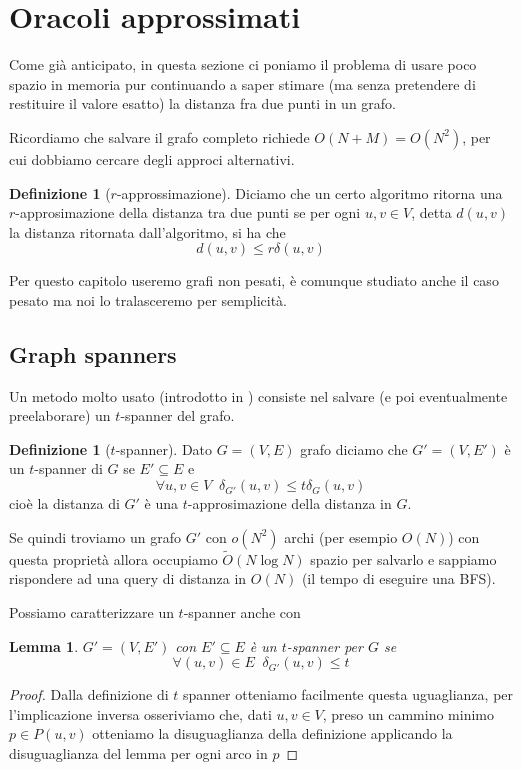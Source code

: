 \documentclass[a4paper,10pt]{amsbook}
\newcounter{counter1}
\theoremstyle{plain}
\newtheorem{mylem}[counter1]{Lemma}
\theoremstyle{definition}
\newtheorem{mydef}[counter1]{Definizione}
\theoremstyle{remark}
\newcommand{\pa}[1]{\left(#1\right)}
\begin{document}
\section{Oracoli approssimati}
\label{sec:oracoliapprossimati}

Come gi\`a anticipato, in questa sezione ci poniamo il problema di
usare poco spazio in memoria pur continuando a saper stimare (ma senza
pretendere di restituire il valore esatto) la distanza fra due punti
in un grafo.

Ricordiamo che salvare il grafo completo richiede $O\pa{ N + M } =
O\pa{ N^2}$, per cui dobbiamo cercare degli approci alternativi.

\begin{mydef}[$r$-approssimazione]
  Diciamo che un certo algoritmo ritorna una $r$-approsimazione della
  distanza tra due punti se per ogni $u,v \in V$, detta $d(u,v)$ la
  distanza ritornata dall'algoritmo, si ha che
  \[ d\pa{u,v} \le r \delta\pa{u,v} \]
\end{mydef}

Per questo capitolo useremo grafi non pesati, \`e comunque studiato
anche il caso pesato ma noi lo tralasceremo per semplicit\`a.

\subsection{Graph spanners}

Un metodo molto usato (introdotto in \cite{graphspanners}) consiste
nel salvare (e poi eventualmente preelaborare) un $t$-spanner del
grafo.

\begin{mydef}[$t$-spanner]
  Dato $G = (V,E)$ grafo diciamo che $G' = (V, E')$ \`e un $t$-spanner
  di $G$ se $E' \subseteq E$ e
  \[ \forall u,v \in V \;\; \delta _{G'} \pa{ u,v} \le t \delta _{G}
    \pa{ u,v} \]
  cio\`e la distanza di $G'$ \`e una $t$-approsimazione della distanza
  in $G$.
\end{mydef}

Se quindi troviamo un grafo $G'$ con $o\pa{ N^2}$ archi (per esempio
$O(N)$) con questa propriet\`a allora occupiamo $\tilde O(N \log N)$
spazio per salvarlo e sappiamo rispondere ad una query di distanza in
$O(N)$ (il tempo di eseguire una BFS).

Possiamo caratterizzare un $t$-spanner anche con
\begin{mylem}
  $G' = (V,E')$ con $E' \subseteq E$ \`e un $t$-spanner per $G$ se
  \[ \forall (u,v) \in E\;\; \delta_{G'} (u,v) \le t \]
\end{mylem}
\begin{proof}
  Dalla definizione di $t$ spanner otteniamo facilmente questa
  uguaglianza, per l'implicazione inversa osseriviamo che, dati $u,v
  \in V$, preso un cammino minimo $p \in P(u,v)$ otteniamo la
  disuguaglianza della definizione applicando la disuguaglianza del
  lemma per ogni arco in $p$
\end{proof}
\end{document}
